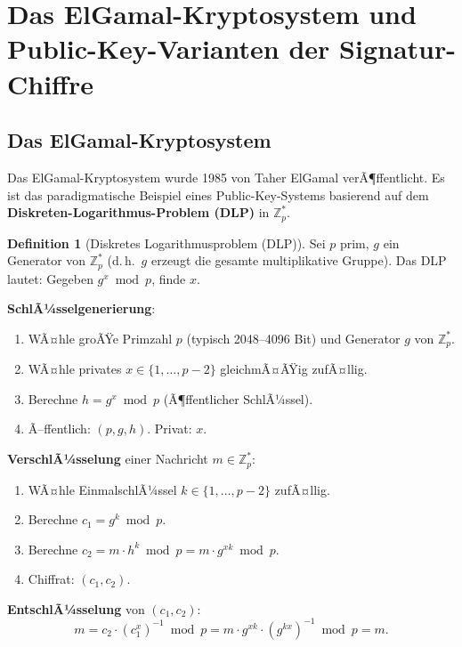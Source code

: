 ﻿\documentclass[a4paper,12pt]{scrreprt}
\theoremstyle{definition}
\newtheorem{definition}{Definition}[section]
\begin{document}
\section{Das ElGamal-Kryptosystem und Public-Key-Varianten der Signatur-Chiffre}

\subsection{Das ElGamal-Kryptosystem}

Das ElGamal-Kryptosystem wurde 1985 von Taher ElGamal \cite{ElG85} verÃ¶ffentlicht. Es ist das paradigmatische Beispiel eines Public-Key-Systems basierend auf dem \textbf{Diskreten-Logarithmus-Problem (DLP)} in $\mathbb{Z}_p^*$.

\begin{definition}[Diskretes Logarithmusproblem (DLP)]
Sei $p$ prim, $g$ ein Generator von $\mathbb{Z}_p^*$ (d.\,h.\ $g$ erzeugt die gesamte multiplikative Gruppe). Das DLP lautet: Gegeben $g^x \bmod p$, finde $x$.
\end{definition}

\textbf{SchlÃ¼sselgenerierung}:
\begin{enumerate}
    \item WÃ¤hle groÃŸe Primzahl $p$ (typisch 2048--4096 Bit) und Generator $g$ von $\mathbb{Z}_p^*$.
    \item WÃ¤hle privates $x \in \{1,\ldots,p-2\}$ gleichmÃ¤ÃŸig zufÃ¤llig.
    \item Berechne $h = g^x \bmod p$ (Ã¶ffentlicher SchlÃ¼ssel).
    \item Ã–ffentlich: $(p, g, h)$. Privat: $x$.
\end{enumerate}

\textbf{VerschlÃ¼sselung} einer Nachricht $m \in \mathbb{Z}_p^*$:
\begin{enumerate}
    \item WÃ¤hle EinmalschlÃ¼ssel $k \in \{1,\ldots,p-2\}$ zufÃ¤llig.
    \item Berechne $c_1 = g^k \bmod p$.
    \item Berechne $c_2 = m \cdot h^k \bmod p = m \cdot g^{xk} \bmod p$.
    \item Chiffrat: $(c_1, c_2)$.
\end{enumerate}

\textbf{EntschlÃ¼sselung} von $(c_1, c_2)$:
\[
m = c_2 \cdot (c_1^x)^{-1} \bmod p = m \cdot g^{xk} \cdot (g^{kx})^{-1} \bmod p = m.
\]
\end{document}
